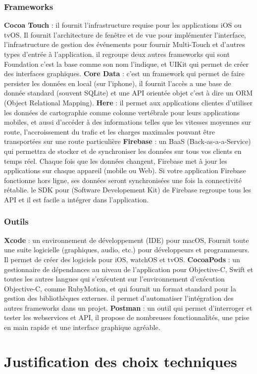 \subsubsection{Frameworks} %
\label{ssub:subsubsection_name}
\begin{itemize}
	\itemb \textbf{Cocoa Touch} : il fournit l'infrastructure requise pour les applications iOS ou tvOS. Il fournit l'architecture de fenêtre et de vue pour implémenter l'interface, l'infrastructure de gestion des événements pour fournir Multi-Touch et d'autres types d'entrée à l'application.
	il regroupe deux autres frameworks qui sont Foundation c'est la base comme son nom l'indique, et UIKit
	qui permet de créer des interfaces graphiques.
	\itemb \textbf{Core Data} : c'est un framework qui permet de faire persister les données en local (sur l'iphone), il fournit l’accès a une base de donnée standard (souvent SQLite) et une API orientée objet c'est à dire un ORM (Object Relational Mapping).
	\itemb \textbf{Here} : il permet aux applications clientes d'utiliser les données de cartographie comme colonne vertébrale pour leurs applications mobiles, et aussi d'accéder à des informations telles que les vitesses moyennes sur route, l'accroissement du trafic et les charges maximales pouvant être transportées sur une route particulière
	\itemb \textbf{Firebase} : un BaaS (Back-as-a-a-Service) qui permettra de stocker et de synchroniser les données sur tous vos clients en temps réel. Chaque fois que les données changent, Firebase met à jour les applications sur chaque appareil (mobile ou Web). Si votre application Firebase fonctionne hors ligne, ses données seront synchronisées une fois la connectivité rétablie.\newline
	le SDK pour (Software Developement Kit) de Firebase regroupe tous les API et il est facile a intégrer dans l'application.
\end{itemize}

\subsubsection{Outils} %
\label{ssub:outils}
\begin{itemize}
	\itemb \textbf{Xcode} : un environnement de développement (IDE) pour macOS, Fournit toute une suite logicielle (graphiques, audio, etc.) pour développeurs et programmeurs. Il permet de créer des logiciels pour iOS, watchOS et tvOS.
	\itemb \textbf{CocoaPods} : un gestionnaire de dépendances au niveau de l'application pour Objective-C, Swift et toutes les autres langues qui s'exécutent sur l'environnement d'exécution Objective-C, comme RubyMotion, et qui fournit un format standard pour la gestion des bibliothèques externes. il permet d'automatiser l’intégration des autres frameworks dans un projet.
	\itemb \textbf{Postman} : un outil qui permet d'interroger et tester les webservices et API, il propose de nombreuses fonctionnalités, une prise en main rapide et une interface graphique agréable.
\end{itemize}

\section{Justification des choix techniques} %
\label{sec:justification_du_choix_technique}


